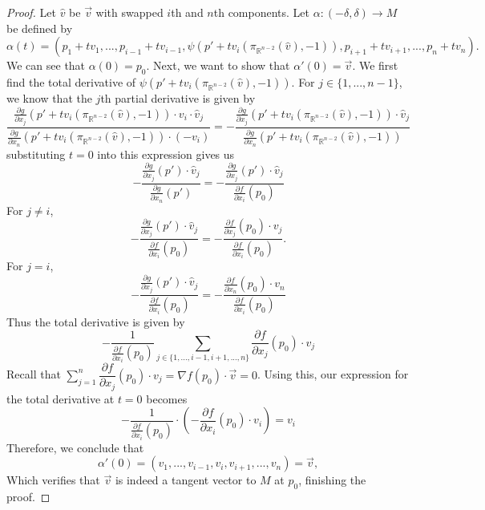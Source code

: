 \documentclass{article}
\theoremstyle{plain} %
\numberwithin{thm}{section} %
\theoremstyle{definition}
\begin{document}
\begin{proof}
        Let \(\hat{v}\) be \(\vec{v}\) with swapped \(i\)th and \(n\)th components. Let \(\alpha : (-\delta ,\delta) \to M\) be defined by
        \[
            \alpha (t) = (p_1 + tv_1, ..., p_{i-1} + tv_{i-1}, \psi (p' + t v_i (\pi _{\mathbb{R}^{n-2}}(\hat{v}), -1)), p_{i+1} + tv_{i+1}, ..., p_n + tv_n).
        \]
        We can see that \(\alpha (0) = p_0\). Next, we want to show that \(\alpha '(0) = \vec{v}\). We first find the total derivative of \(\psi (p' + t v_i (\pi _{\mathbb{R}^{n-2}}(\hat{v}), -1))\). For \(j \in \{1, ..., n-1 \}\), we know that the \(j\)th partial derivative is given by
        \[
            \dfrac{\frac{\partial g}{\partial x_j}(p' + t v_i (\pi _{\mathbb{R}^{n-2}}(\hat{v}), -1)) \cdot v_i \cdot \hat{v}_j}{\frac{\partial g}{\partial x_n}(p' + t v_i (\pi _{\mathbb{R}^{n-2}}(\hat{v}), -1)) \cdot (-v_i)} = -\dfrac{\frac{\partial g}{\partial x_j}(p' + t v_i (\pi _{\mathbb{R}^{n-2}}(\hat{v}), -1)) \cdot \hat{v}_j}{\frac{\partial g}{\partial x_n}(p' + t v_i (\pi _{\mathbb{R}^{n-2}}(\hat{v}), -1))}
        \]
        substituting \(t=0\) into this expression gives us
        \[
            -\dfrac{\frac{\partial g}{\partial x_j}(p') \cdot \hat{v}_j}{\frac{\partial g}{\partial x_n}(p')} = -\dfrac{\frac{\partial g}{\partial x_j}(p') \cdot \hat{v}_j}{\frac{\partial f}{\partial x_i}(p_0)}
        \]
        For \(j \neq i\),
        \[
            -\dfrac{\frac{\partial g}{\partial x_j}(p') \cdot \hat{v}_j}{\frac{\partial f}{\partial x_i}(p_0)} = -\dfrac{\frac{\partial f}{\partial x_j}(p_0) \cdot v_j}{\frac{\partial f}{\partial x_i}(p_0)}.
        \]
        For \(j = i\),
        \[
            -\dfrac{\frac{\partial g}{\partial x_j}(p') \cdot \hat{v}_j}{\frac{\partial f}{\partial x_i}(p_0)} = -\dfrac{\frac{\partial f}{\partial x_n}(p_0 ) \cdot v_n}{\frac{\partial f}{\partial x_i}(p_0)}
        \]
        Thus the total derivative is given by
        \[
            - \frac{1}{\frac{\partial f}{\partial x_i}(p_0)}\sum_{j \in \{1, ..., i-1, i+1, ..., n\}}\frac{\partial f}{\partial x_j}(p_0) \cdot v_j
        \]
        Recall that \(\sum\limits_{j=1}^n \dfrac{\partial f}{\partial x_j}(p_0) \cdot v_j = \nabla f(p_0) \cdot \vec{v} = 0\). Using this, our expression for the total derivative at \(t = 0\) becomes
        \[
            - \frac{1}{\frac{\partial f}{\partial x_i}(p_0)} \cdot \left( -\frac{\partial f}{\partial x_i} (p_0) \cdot v_i \right) = v_i
        \]
        Therefore, we conclude that
        \[
            \alpha' (0) = (v_1, ..., v_{i-1}, v_i, v_{i+1}, ..., v_n) = \vec{v},
        \]
        Which verifies that \(\vec{v}\) is indeed a tangent vector to \(M\) at \(p_0\), finishing the proof.


\end{proof}
\end{document}
